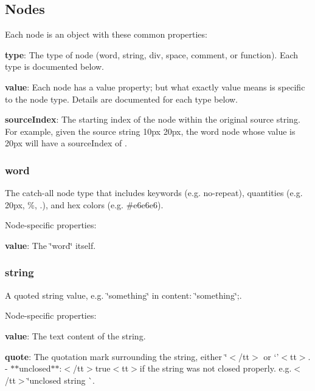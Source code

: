 \subsection*{Nodes}

Each node is an object with these common properties\+:


\begin{DoxyItemize}
\item {\bfseries type}\+: The type of node ({\ttfamily word}, {\ttfamily string}, {\ttfamily div}, {\ttfamily space}, {\ttfamily comment}, or {\ttfamily function}). Each type is documented below.
\item {\bfseries value}\+: Each node has a {\ttfamily value} property; but what exactly {\ttfamily value} means is specific to the node type. Details are documented for each type below.
\item {\bfseries source\+Index}\+: The starting index of the node within the original source string. For example, given the source string {\ttfamily 10px 20px}, the {\ttfamily word} node whose value is {\ttfamily 20px} will have a {\ttfamily source\+Index} of {}.
\end{DoxyItemize}

\subsubsection*{word}

The catch-\/all node type that includes keywords (e.\+g. {\ttfamily no-\/repeat}), quantities (e.\+g. {\ttfamily 20px}, {\%}, {.}), and hex colors (e.\+g. {\ttfamily \#e6e6e6}).

Node-\/specific properties\+:


\begin{DoxyItemize}
\item {\bfseries value}\+: The \char`\"{}word\char`\"{} itself.
\end{DoxyItemize}

\subsubsection*{string}

A quoted string value, e.\+g. {\ttfamily \char`\"{}something\char`\"{}} in {\ttfamily content\+: \char`\"{}something\char`\"{};}.

Node-\/specific properties\+:


\begin{DoxyItemize}
\item {\bfseries value}\+: The text content of the string.
\item {\bfseries quote}\+: The quotation mark surrounding the string, either {\ttfamily \char`\"{}$<$/tt$>$ or `'$<$tt$>$.
-\/ $\ast$$\ast$unclosed$\ast$$\ast$\+:$<$/tt$>$true$<$tt$>$if the string was not closed properly. e.\+g.$<$/tt$>$\char`\"{}unclosed string \`{}.}
\end{DoxyItemize}

